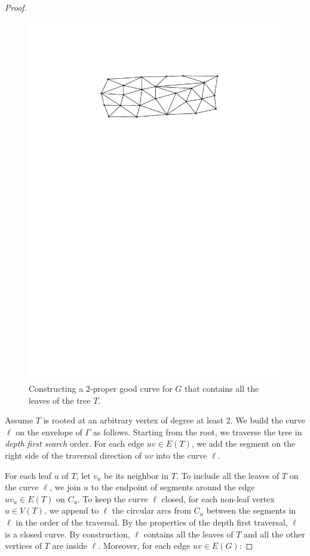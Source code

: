 \documentclass{article}
\theoremstyle{definition}
\begin{document}
\begin{proof}
\begin{figure}
        \includegraphics[page=4]{figs/proper_good}
        \caption{Constructing a $2$-proper good curve for $G$ that contains all the leaves of the tree $T$.}
        \label{tree_walking}
    \end{figure}


    Assume $T$ is rooted at an arbitrary vertex of degree at least 2. We build the curve $\ell$ on the envelope of $\Gamma$ as follows. Starting from the root, we traverse the tree in \textit{depth first search} order. For each edge $uv \in E(T)$, we add the segment on the right side of the traversal direction of $uv$ into the curve $\ell$.

    For each leaf $u$ of $T$, let $v_u$ be its neighbor in $T$. To include all the leaves of $T$ on the curve $\ell$, we join $u$ to the endpoint of segments around the edge $uv_u \in E(T)$ on $C_u$. To keep the curve $\ell$ closed, for each non-leaf vertex $u \in V(T)$, we append to $\ell$ the circular arcs from $C_u$ between the segments in $\ell$ in the order of the traversal. By the properties of the depth first traversal, $\ell$ is a closed curve. By construction, $\ell$ contains all the leaves of $T$ and all the other vertices of $T$ are inside $\ell$. Moreover, for each edge $uv \in E(G)$:


\end{proof}
\end{document}
